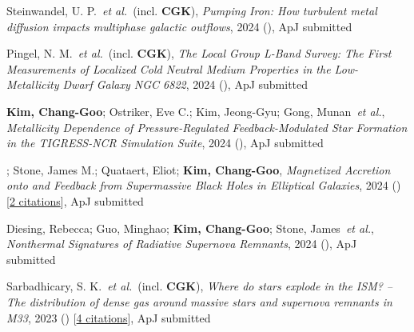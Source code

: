 \item Steinwandel, U. P.~\textit{et al.}~(incl. \textbf{CGK}), \textit{Pumping Iron: How turbulent metal diffusion impacts multiphase galactic outflows}, 2024 (), ApJ submitted

\item Pingel, N. M.~\textit{et al.}~(incl. \textbf{CGK}), \textit{The Local Group L-Band Survey: The First Measurements of Localized Cold Neutral Medium Properties in the Low-Metallicity Dwarf Galaxy NGC 6822}, 2024 (), ApJ submitted

\item \textbf{Kim, Chang-Goo}; Ostriker, Eve C.; Kim, Jeong-Gyu; Gong, Munan~\textit{et al.}, \textit{Metallicity Dependence of Pressure-Regulated Feedback-Modulated Star Formation in the TIGRESS-NCR Simulation Suite}, 2024 (), ApJ submitted

\item {}; Stone, James M.; Quataert, Eliot; \textbf{Kim, Chang-Goo}, \textit{Magnetized Accretion onto and Feedback from Supermassive Black Holes in Elliptical Galaxies}, 2024 () [\href{http://adsabs.harvard.edu/abs/2024arXiv240511711G}{2 citations}], ApJ submitted

\item Diesing, Rebecca; Guo, Minghao; \textbf{Kim, Chang-Goo}; Stone, James~\textit{et al.}, \textit{Nonthermal Signatures of Radiative Supernova Remnants}, 2024 (), ApJ submitted

\item Sarbadhicary, S. K.~\textit{et al.}~(incl. \textbf{CGK}), \textit{Where do stars explode in the ISM? -- The distribution of dense gas around massive stars and supernova remnants in M33}, 2023 () [\href{http://adsabs.harvard.edu/abs/2023arXiv231017694S}{4 citations}], ApJ submitted